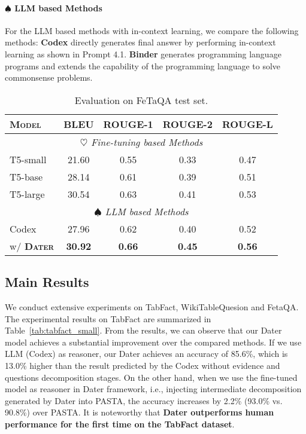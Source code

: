 \paragraph{$\spadesuit$ \textbf{LLM based Methods}} For the LLM based methods with in-context learning, we compare the following methods:
\textbf{Codex} \citep{codex} directly generates final answer by performing in-context learning as shown in Prompt 4.1.  
\textbf{Binder} \citep{binder} generates programming language programs and extends the capability of the programming language to solve commonsense problems. 

\begin{table}
  \centering
  \begin{tabular}{lcccc}
    \toprule
    \textsc{\textbf{Model}} & \textsc{\textbf{BLEU}} &  \textsc{\textbf{ROUGE-1}} & \textsc{\textbf{ROUGE-2}} & \textsc{\textbf{ROUGE-L}} \\
    \midrule
    \multicolumn{5}{c}{\textit{$\heartsuit$ Fine-tuning based Methods}} \\
    T5-small    &   21.60   &   0.55    &   0.33    &   0.47    \\
    T5-base     &   28.14   &   0.61    &   0.39    &   0.51    \\
    T5-large    &   30.54   &   0.63    &   0.41    &   0.53    \\
    \midrule
    \multicolumn{5}{c}{\textit{ $\spadesuit$ LLM based Methods}} \\
    Codex & 27.96  &   0.62   &   0.40   &0.52      \\
    \rowcolor[RGB]{237,237,237} \quad w/ \textbf{\textsc{Dater}}   &   \textbf{30.92}    &   \textbf{0.66}   &   \textbf{0.45}    &    \textbf{0.56}    \\
    \bottomrule
  \end{tabular}
  \vspace{0.2cm}
  \caption{Evaluation on FeTaQA test set.}
  \label{tab:fetaqa}
\end{table}

\subsection{Main Results}
We conduct extensive experiments on TabFact, WikiTableQuesion and FetaQA. The experimental results on TabFact are summarized in Table~\ref{tab:tabfact_small}. From the results, we can observe that our Dater model achieves a substantial improvement over the compared methods. 
If we use LLM (Codex) as reasoner, our Dater achieves an accuracy of 85.6\%, which is 13.0\% higher than the result predicted by the Codex without evidence and questions decomposition stages. 
On the other hand, when we use the fine-tuned model as reasoner in Dater framework, i.e., injecting intermediate decomposition generated by Dater into PASTA, the accuracy increases by 2.2\% (93.0\% vs. 90.8\%) over PASTA.
It is noteworthy that \textbf{Dater outperforms human performance for the first time on the TabFact dataset}.  

